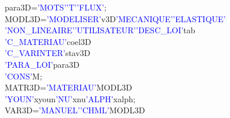 para3D\hspace*{1em}=\hspace*{1em}\textcolor{blue}{'MOTS'}\hspace*{1em}\textcolor{blue}{'T'}\hspace*{1em}\textcolor{blue}{'FLUX'};\\
\newline
MODL3D\hspace*{1em}=\hspace*{1em}\textcolor{blue}{'MODELISER'}\hspace*{1em}v3D\hspace*{1em}\textcolor{blue}{'MECANIQUE'}\hspace*{1em}\textcolor{blue}{'ELASTIQUE'}\\
\textcolor{blue}{'NON\_LINEAIRE'}\hspace*{1em}\textcolor{blue}{'UTILISATEUR'}\hspace*{1em}\textcolor{blue}{'DESC\_LOI'}\hspace*{1em}tab\\
\textcolor{blue}{'C\_MATERIAU'}\hspace*{1em}coel3D\\
\textcolor{blue}{'C\_VARINTER'}\hspace*{1em}stav3D\\
\textcolor{blue}{'PARA\_LOI'}\hspace*{1em}\hspace*{1em}\hspace*{1em}para3D\\
\textcolor{blue}{'CONS'}\hspace*{1em}M;\\
\newline
MATR3D\hspace*{1em}=\hspace*{1em}\textcolor{blue}{'MATERIAU'}\hspace*{1em}MODL3D\\
\textcolor{blue}{'YOUN'}\hspace*{1em}xyoun\hspace*{1em}\textcolor{blue}{'NU'}\hspace*{1em}xnu\hspace*{1em}\textcolor{blue}{'ALPH'}\hspace*{1em}xalph;\\
\newline
VAR3D\hspace*{1em}=\hspace*{1em}\textcolor{blue}{'MANUEL'}\hspace*{1em}\textcolor{blue}{'CHML'}\hspace*{1em}MODL3D\\
